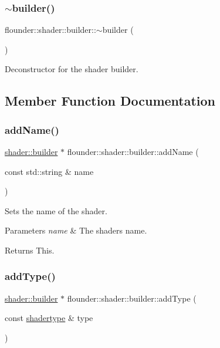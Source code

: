 \subsubsection{\texorpdfstring{$\sim$builder()}{~builder()}}
{\footnotesize\ttfamily flounder\+::shader\+::builder\+::$\sim$builder (\begin{DoxyParamCaption}{ }\end{DoxyParamCaption})}



Deconstructor for the shader builder. 



\subsection{Member Function Documentation}
\mbox{\label{classflounder_1_1shader_1_1builder_adb72c6a3a95ee90a1ff8616af3f2ba99}} 
\subsubsection{\texorpdfstring{add\+Name()}{addName()}}
{\footnotesize\ttfamily \hyperlink{classflounder_1_1shader_1_1builder}{shader\+::builder} $\ast$ flounder\+::shader\+::builder\+::add\+Name (\begin{DoxyParamCaption}\item[{const std\+::string \&}]{name }\end{DoxyParamCaption})}



Sets the name of the shader. 


\begin{DoxyParams}{Parameters}
{\em name} & The shaders name. \\
\hline
\end{DoxyParams}
\begin{DoxyReturn}{Returns}
This. 
\end{DoxyReturn}
\mbox{\label{classflounder_1_1shader_1_1builder_ac994656b2088dc292ff04de8b24ebdcf}} 
\subsubsection{\texorpdfstring{add\+Type()}{addType()}}
{\footnotesize\ttfamily \hyperlink{classflounder_1_1shader_1_1builder}{shader\+::builder} $\ast$ flounder\+::shader\+::builder\+::add\+Type (\begin{DoxyParamCaption}\item[{const \hyperlink{structflounder_1_1shadertype}{shadertype} \&}]{type }\end{DoxyParamCaption})}



